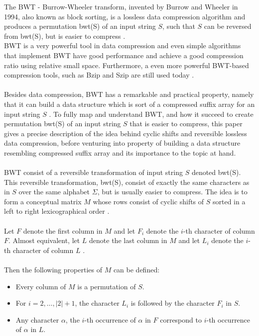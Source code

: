 \documentclass[12pt]{article} %
\begin{document}
The BWT - Burrow-Wheeler transform, invented by Burrow and Wheeler in 1994, also known as block sorting, is a lossless data compression algorithm and produces a permutation bwt(S) of an input string $S$, such that $S$ can be reversed from bwt(S), but is easier to compress \cite{BWT}. \\
BWT is a very powerful tool in data compression and even simple algorithms that implement BWT have good performance and achieve a good compression ratio using relative small space. Furthermore, a even more powerful BWT-based compression tools, such as Bzip and Szip are still used today \cite{BWT}.
\\ \\
Besides data compression, BWT has a remarkable and practical property, namely that it can build a data structure which is sort of a compressed suffix array for an input string $S$ \cite{BWT}. To fully map and understand BWT, and how it succeed to create permutation bwt(S) of an input string $S$ that is easier to compress, this paper gives a precise description of the idea behind cyclic shifts and reversible lossless data compression, before venturing into property of building a data structure resembling compressed suffix array and its importance to the topic at hand. 
\\ \\
BWT consist of a reversible transformation of input string $S$ denoted bwt(S). This reversible transformation, bwt(S), consist of exactly the same characters as in $S$ over the same alphabet $\Sigma$, but is usually easier to compress. The idea is to form a conceptual matrix $M$ whose rows consist of cyclic shifts of $S$ sorted in a left to right lexicographical order \cite{BWT}.
\\ \\
Let $F$ denote the first column in $M$ and let $F_i$ denote the $i$-th character of column $F$. Almost equivalent, let $L$ denote the last column in $M$ and let $L_i$ denote the $i$-th character of column $L$ \cite{BWT}.
\\ \\
Then the following properties of $M$ can be defined:
\begin{itemize}
  \item Every column of $M$ is a permutation of $S$.
  \item For $i=2, \ldots , |2| + 1$, the character $L_i$ is followed by the character $F_i$ in $S$.
  \item Any character $\alpha$, the $i$-th occurrence of $\alpha$ in $F$ correspond to $i$-th occurrence of $\alpha$ in $L$. 
\end{itemize}
\end{document}
